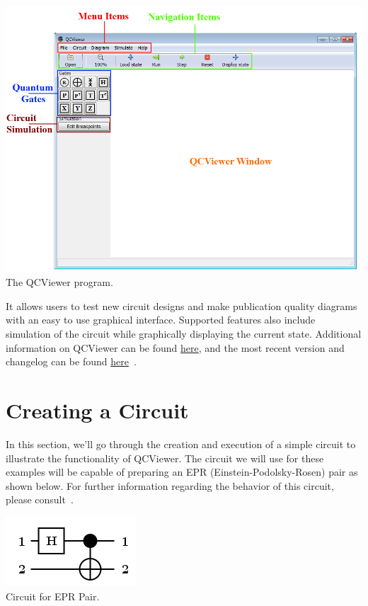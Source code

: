 \documentclass[10pt]{article}
\theoremstyle{definition}
\begin{document}
\begin{center}
\includegraphics[scale=0.50]{Figures/QCViewerGUI.png} \\
The QCViewer program.
\end{center}

It allows users to test new circuit designs and make publication quality diagrams with an easy to use graphical interface. Supported features also include simulation of the circuit while graphically displaying the current state. Additional information on QCViewer can be found \href{http://qcirc.iqc.uwaterloo.ca/QCViewer/QCViewer.pdf}{here}, and the most recent version and changelog can be found \href{http://qcirc.iqc.uwaterloo.ca/index.php?n=Projects.QCViewer}{here}~\cite{Parent2011Quantum}. 

\section{Creating a Circuit} \label{sec:CreatingaCircuit}
In this section, we'll go through the creation and execution of a simple circuit to illustrate the functionality of QCViewer. The circuit we will use for these examples will be capable of preparing an EPR (Einstein-Podolsky-Rosen) pair as shown below. For further information regarding the behavior of this circuit, please consult~\cite{Nielsen2002Quantum}.

\begin{center}
\includegraphics[scale=.7]{Figures/CreateCircuit/EPRCircuit}\\
Circuit for EPR Pair.
\end{center}
\end{document}
